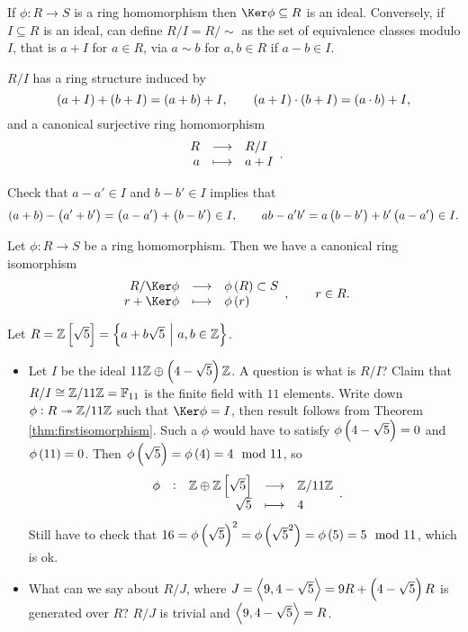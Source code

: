 \begin{fact*}
If $ \phi : R \to S $ is a ring homomorphism then $ \Ker \phi \subseteq R $ is an ideal. Conversely, if $ I \subseteq R $ is an ideal, can define $ R / I = R / \sim $ as the set of equivalence classes modulo $ I $, that is $ a + I $ for $ a \in R $, via $ a \sim b $ for $ a, b \in R $ if $ a - b \in I $.
\end{fact*}

\begin{proposition}
$ R / I $ has a ring structure induced by
$$ \br{a + I} + \br{b + I} = \br{a + b} + I, \qquad \br{a + I} \cdot \br{b + I} = \br{a \cdot b} + I, $$
and a canonical surjective ring homomorphism
$$ \function{R}{R / I}{a}{a + I}. $$
\end{proposition}

Check that $ a - a' \in I $ and $ b - b' \in I $ implies that
$$ \br{a + b} - \br{a' + b'} = \br{a - a'} + \br{b - b'} \in I, \qquad ab - a'b' = a\br{b - b'} + b'\br{a - a'} \in I. $$

\begin{theorem}
\label{thm:firstisomorphism}
Let $ \phi : R \to S $ be a ring homomorphism. Then we have a canonical ring isomorphism
$$ \function{R / \Ker \phi}{\phi\br{R} \subset S}{r + \Ker \phi}{\phi\br{r}}, \qquad r \in R. $$
\end{theorem}

\begin{example*}
Let $ R = \ZZ\sbr{\sqrt{5}} = \cbr{a + b\sqrt{5} \st a, b \in \ZZ} $.
\begin{itemize}
\item Let $ I $ be the ideal $ 11\ZZ \oplus \br{4 - \sqrt{5}}\ZZ $. A question is what is $ R / I $? Claim that $ R / I \cong \mathbb{Z} / 11\mathbb{Z} = \mathbb{F}_{11} $ is the finite field with $ 11 $ elements. Write down $ \phi : R \twoheadrightarrow \mathbb{Z} / 11\mathbb{Z} $ such that $ \Ker \phi = I $, then result follows from Theorem \ref{thm:firstisomorphism}. Such a $ \phi $ would have to satisfy $ \phi\br{4 - \sqrt{5}} = 0 $ and $ \phi\br{11} = 0 $. Then $ \phi\br{\sqrt{5}} = \phi\br{4} = 4 \mod 11 $, so
$$ \function[\phi]{\ZZ \oplus \ZZ\sbr{\sqrt{5}}}{\ZZ / 11\ZZ}{\sqrt{5}}{4}. $$
Still have to check that $ 16 = \phi\br{\sqrt{5}}^2 = \phi\br{\sqrt{5}^2} = \phi\br{5} = 5 \mod 11 $, which is ok.
\item What can we say about $ R / J $, where $ J = \abr{9, 4 - \sqrt{5}} = 9R + \br{4 - \sqrt{5}}R $ is generated over $ R $? $ R / J $ is trivial and $ \left\langle 9, 4 - \sqrt{5} \right\rangle = R $.
\end{itemize}
\end{example*}

